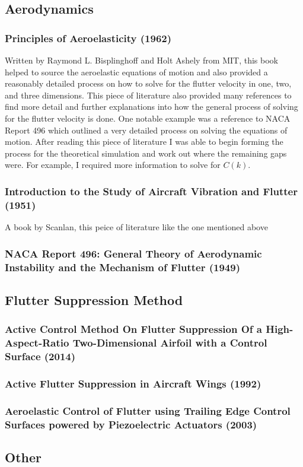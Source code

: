 \subsection{Aerodynamics}

\subsubsection{Principles of Aeroelasticity (1962)}
Written by Raymond L. Bisplinghoff and Holt Ashely from MIT, this book helped to source the aeroelastic equations of motion and also provided a reasonably detailed process on how to solve for the flutter velocity in one, two, and three dimensions.  This piece of literature also provided many references to find more detail and further explanations into how the general process of solving for the flutter velocity is done.  One notable example was a reference to NACA Report  496 which outlined a very detailed process on solving the equations of motion.  After reading this piece of literature I was able to begin forming the process for the theoretical simulation and work out where the remaining gaps were.  For example, I required more information to solve for $C(k)$. 

\subsubsection{Introduction to the Study of Aircraft Vibration and Flutter (1951)}
A book by Scanlan, this peice of literature like the one mentioned above 

\subsubsection{NACA Report 496: General Theory of Aerodynamic Instability and the Mechanism of Flutter (1949)}

\subsection{Flutter Suppression Method}

\subsubsection{Active Control Method On Flutter Suppression Of a
High-Aspect-Ratio Two-Dimensional Airfoil with a Control Surface (2014)}

\subsubsection{Active Flutter Suppression in Aircraft Wings (1992)}

\subsubsection{Aeroelastic Control of Flutter using Trailing Edge Control Surfaces powered by Piezoelectric Actuators (2003)}
\subsection{Other}

